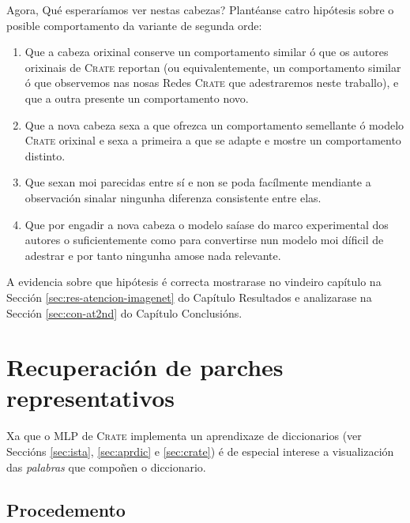Agora, Qué esperaríamos ver nestas cabezas? Plantéanse catro hipótesis sobre o posible comportamento da variante de segunda orde:
\begin{enumerate}[label=(\alph*)]
				\item Que a cabeza orixinal conserve un comportamento similar ó que os autores orixinais de \textsc{Crate} reportan (ou equivalentemente, un comportamento similar ó que observemos nas nosas Redes \textsc{Crate} que adestraremos neste traballo), e que a outra presente un comportamento novo.
				\item Que a nova cabeza sexa a que ofrezca un comportamento semellante ó modelo \textsc{Crate} orixinal e sexa a primeira a que se adapte e mostre un comportamento distinto.
				\item Que sexan moi parecidas entre sí e non se poda facílmente mendiante a observación sinalar ningunha diferenza consistente entre elas.
				\item Que por engadir a nova cabeza o modelo saíase do marco experimental dos autores o suficientemente como para convertirse nun modelo moi díficil de adestrar e por tanto ningunha amose nada relevante.
\end{enumerate}

A evidencia sobre que hipótesis é correcta mostrarase no vindeiro capítulo na Sección \ref{sec:res-atencion-imagenet} do Capítulo Resultados e analizarase na Sección \ref{sec:con-at2nd} do Capítulo Conclusións.

\section{Recuperación de parches representativos}

Xa que o MLP de \textsc{Crate} implementa un aprendixaze de diccionarios (ver Seccións \ref{sec:ista}, \ref{sec:aprdic} e \ref{sec:crate}) é de especial interese a visualización das \emph{palabras} que compoñen o diccionario.

\subsection{Procedemento}
\label{sec:procedemento-parches}


